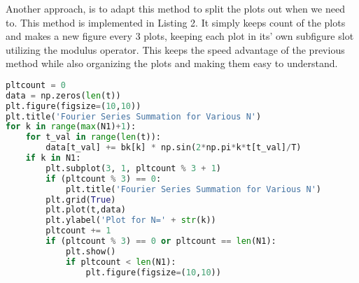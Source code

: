 \documentclass[12pt]{report}
\begin{document}
Another approach, is to adapt this method to split the plots out when we
need to. This method is implemented in Listing 2. It simply keeps count
of the plots and makes a new figure every 3 plots, keeping each plot in
its' own subfigure slot utilizing the modulus operator. This keeps the
speed advantage of the previous method while also organizing the plots
and making them easy to understand. \pagebreak 

\begin{lstlisting}[language=Python, caption=Adapted implementation to give each plot its own subplot.]
pltcount = 0
data = np.zeros(len(t))
plt.figure(figsize=(10,10))
plt.title('Fourier Series Summation for Various N')
for k in range(max(N1)+1):
    for t_val in range(len(t)):
        data[t_val] += bk[k] * np.sin(2*np.pi*k*t[t_val]/T)
    if k in N1:
        plt.subplot(3, 1, pltcount % 3 + 1)
        if (pltcount % 3) == 0:
            plt.title('Fourier Series Summation for Various N')
        plt.grid(True)
        plt.plot(t,data)
        plt.ylabel('Plot for N=' + str(k))
        pltcount += 1
        if (pltcount % 3) == 0 or pltcount == len(N1):
            plt.show()
            if pltcount < len(N1):
                plt.figure(figsize=(10,10))

\end{lstlisting}


    
    
    
    
\end{document}

